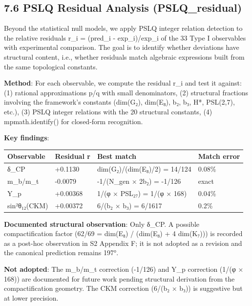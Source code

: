 \documentclass[11pt,a4paper]{article}
\begin{document}
\subsection{7.6 PSLQ Residual Analysis (PSLQ\_\allowbreak{}residual)}\label{pslq-residual-analysis-pslq_residual}

Beyond the statistical null models, we apply PSLQ integer relation detection to the relative residuals r\_\allowbreak{}i = (pred\_\allowbreak{}i - exp\_\allowbreak{}i)/exp\_\allowbreak{}i of the 33 Type I observables with experimental comparison. The goal is to identify whether deviations have structural content, i.e., whether residuals match algebraic expressions built from the same topological constants.

\textbf{Method}: For each observable, we compute the residual r\_\allowbreak{}i and test it against: (1) rational approximations p/q with small denominators, (2) structural fractions involving the framework's constants (dim(G₂), dim(E₈), b₂, b₃, H*, PSL(2,7), etc.), (3) PSLQ integer relations with the 20 structural constants, (4) mpmath.identify() for closed-form recognition.

\textbf{Key findings}:

\begin{longtable}[]{@{}llll@{}}
\toprule\noalign{}
Observable & Residual r & Best match & Match error \\
\midrule\noalign{}
\endhead
\bottomrule\noalign{}
\endlastfoot
δ\_\allowbreak{}CP & +0.1130 & dim(G₂)/(dim(E₈)/2) = 14/124 & 0.08\% \\
m\_\allowbreak{}b/m\_\allowbreak{}t & -0.0079 & -1/(N\_\allowbreak{}gen × 2b₂) = -1/126 & exact \\
Y\_\allowbreak{}p & +0.00368 & 1/(φ × PSL₂₇) = 1/(φ × 168) & 0.04\% \\
sin²θ₁₂(CKM) & +0.00372 & 6/(b₂ × b₃) = 6/1617 & 0.2\% \\
\end{longtable}

\textbf{Documented structural observation}: Only δ\_\allowbreak{}CP. A possible compactification factor (62/69 = dim(E₈) / (dim(E₈) + 4 dim(K₇))) is recorded as a post-hoc observation in S2 Appendix F; it is not adopted as a revision and the canonical prediction remains 197°.

\textbf{Not adopted}: The m\_\allowbreak{}b/m\_\allowbreak{}t correction (-1/126) and Y\_\allowbreak{}p correction (1/(φ × 168)) are documented for future work pending structural derivation from the compactification geometry. The CKM correction (6/(b₂ × b₃)) is suggestive but at lower precision.
\end{document}
